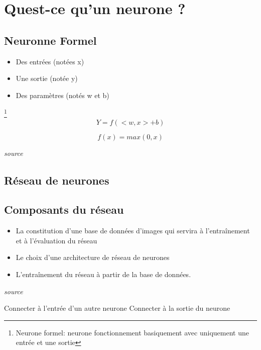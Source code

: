 \documentclass{article}
\begin{document}
\section{Quest-ce qu'un neurone ?}

\subsection{Neuronne Formel}

\begin{itemize}
    \item Des entrées (notées x)
    \item Une sortie (notée y)
    \item Des paramètres (notés w et b)
\end{itemize}

\footnote{Neurone formel: neurone fonctionnement basiquement avec uniquement une entrée et une sortie}
\begin{equation}
   Y = f(<w,x>+b)
\end{equation}

\begin{equation}
   f(x) = max(0,x)
\end{equation}



\textit{source \cite{openclassroom}}

\subsection{Réseau de neurones}

\newpage
\subsection{Composants du réseau}

\begin{itemize}
    \item La constitution d'une base de données d'images qui servira à l'entraînement et à l'évaluation du réseau
    \item Le choix d'une architecture de réseau de neurones
    \item L'entraînement du réseau à partir de la base de données.
\end{itemize}

\textit{source \cite{openclassroom}}

\begin{algorithm}
\caption{Comportement d'un neurone}
\begin{algorithmic}

\STATE Connecter à l'entrée d'un autre neurone
\ELSE
\STATE Connecter à la sortie du neurone
\ENDIF
\end{algorithmic}
\end{algorithm}
\end{document}
